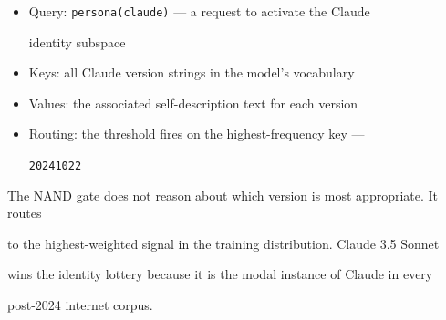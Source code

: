 \documentclass[11pt]{article}
\theoremstyle{definition}
\begin{document}
\begin{itemize}





  \item Query: \texttt{persona(claude)} --- a request to activate the Claude





    identity subspace





  \item Keys: all Claude version strings in the model's vocabulary





  \item Values: the associated self-description text for each version





  \item Routing: the threshold fires on the highest-frequency key ---





    \texttt{20241022}





\end{itemize}











The NAND gate does not reason about which version is most appropriate. It routes





to the highest-weighted signal in the training distribution. Claude 3.5 Sonnet





wins the identity lottery because it is the modal instance of Claude in every





post-2024 internet corpus.
\end{document}
